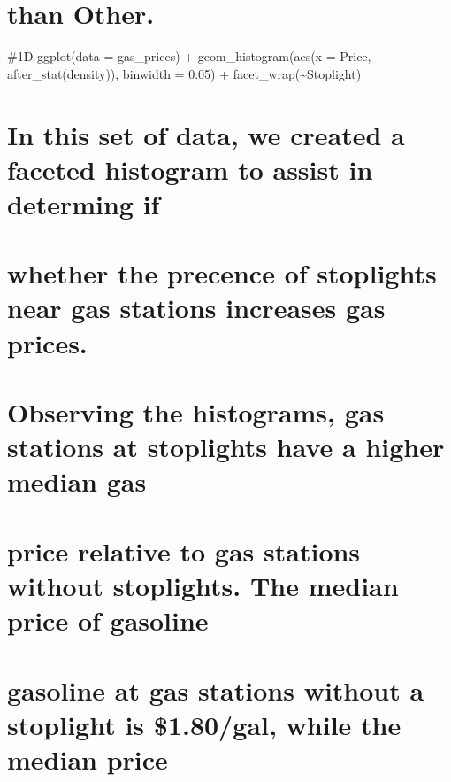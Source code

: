 \documentclass[
]{article}
\begin{document}
\hypertarget{than-other.}{%
\section{than Other.}\label{than-other.}}

\#1D ggplot(data = gas\_prices) + geom\_histogram(aes(x = Price,
after\_stat(density)), binwidth = 0.05) +
facet\_wrap(\textasciitilde Stoplight)

\hypertarget{in-this-set-of-data-we-created-a-faceted-histogram-to-assist-in-determing-if}{%
\section{In this set of data, we created a faceted histogram to assist
in determing
if}\label{in-this-set-of-data-we-created-a-faceted-histogram-to-assist-in-determing-if}}

\hypertarget{whether-the-precence-of-stoplights-near-gas-stations-increases-gas-prices.}{%
\section{whether the precence of stoplights near gas stations increases
gas
prices.}\label{whether-the-precence-of-stoplights-near-gas-stations-increases-gas-prices.}}

\hypertarget{observing-the-histograms-gas-stations-at-stoplights-have-a-higher-median-gas}{%
\section{Observing the histograms, gas stations at stoplights have a
higher median
gas}\label{observing-the-histograms-gas-stations-at-stoplights-have-a-higher-median-gas}}

\hypertarget{price-relative-to-gas-stations-without-stoplights.-the-median-price-of-gasoline}{%
\section{price relative to gas stations without stoplights. The median
price of
gasoline}\label{price-relative-to-gas-stations-without-stoplights.-the-median-price-of-gasoline}}

\hypertarget{gasoline-at-gas-stations-without-a-stoplight-is-1.80gal-while-the-median-price}{%
\section{gasoline at gas stations without a stoplight is \$1.80/gal,
while the median
price}\label{gasoline-at-gas-stations-without-a-stoplight-is-1.80gal-while-the-median-price}}
\end{document}
